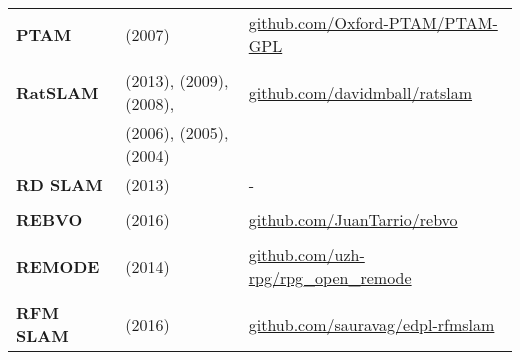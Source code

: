 \documentclass[a4paper,12pt]{scrartcl}
\begin{document}
{\begin{longtable}{l|l|l}
    \textbf{PTAM}          & \cite{Klein2007} (2007)                                                                     & {\url{github.com/Oxford-PTAM/PTAM-GPL}}                               \\
                           &                                                                                             &                                                                       \\ [-3mm]
    \textbf{RatSLAM}       & \cite{Ball2013} (2013), \cite{Maddern2009} (2009), \cite{Milford2008} (2008),               & {\url{github.com/davidmball/ratslam}}                                 \\
                           & \cite{Milford2006} (2006), \cite{Milford2005} (2005), \cite{Milford2004} (2004)             &                                                                       \\
    \textbf{RD SLAM}       & \cite{Tan2013a} (2013)                                                                      & -                                                                     \\
                           &                                                                                             &                                                                       \\ [-3mm]
    \textbf{REBVO}         & \cite{Tarrio2016} (2016)                                                                    & {\url{github.com/JuanTarrio/rebvo}}                                   \\
                           &                                                                                             &                                                                       \\ [-3mm]
    \textbf{REMODE}        & \cite{Pizzoli2014} (2014)                                                                   & {\url{github.com/uzh-rpg/rpg_open_remode}}                            \\
                           &                                                                                             &                                                                       \\ [-3mm]
    \textbf{RFM SLAM}      & \cite{Agarwal2016} (2016)                                                                   & {\url{github.com/sauravag/edpl-rfmslam}}                              \\

\end{longtable}}
\end{document}
